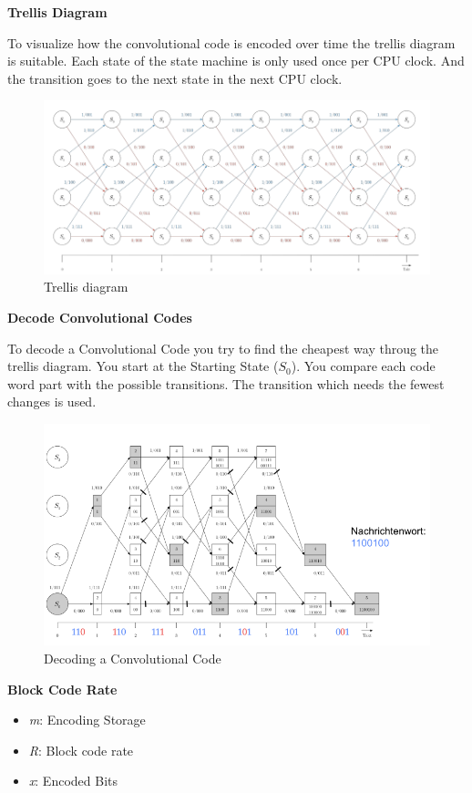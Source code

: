 \documentclass[11pt,twoside,twocolumn,landscape]{article}
\begin{document}
\textbf{Trellis Diagram}

To visualize how the convolutional code is encoded over time the trellis diagram is suitable.
Each state of the state machine is only used once per CPU clock.
And the transition goes to the next state in the next CPU clock.


\begin{figure}[htbp]
\centering
\includegraphics[width=.9\linewidth]{img/trellisdiagramm.png}
\caption{\label{fig:orga939eaa}Trellis diagram}
\end{figure}

\textbf{Decode Convolutional Codes}

To decode a Convolutional Code you try to find the cheapest way throug the trellis diagram.
You start at the Starting State (\(S_0\)).
You compare each code word part with the possible transitions.
The transition which needs the fewest changes is used.


\begin{figure}[htbp]
\centering
\includegraphics[width=.9\linewidth]{img/decode_convoluitonal_code.png}
\caption{\label{fig:org594778c}Decoding a Convolutional Code}
\end{figure}

\textbf{Block Code Rate}

\begin{itemize}
\item \emph{m}: Encoding Storage
\item \emph{R}: Block code rate
\item \emph{x}: Encoded Bits
\end{itemize}
\end{document}
